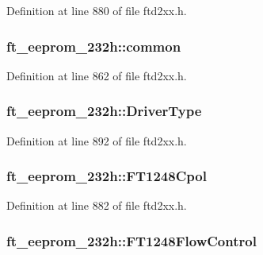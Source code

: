 Definition at line 880 of file ftd2xx.h.\hypertarget{structft__eeprom__232h_a37234d2dd02343759c92fd97e4835ccb}{
\subsubsection[{common}]{ {\bf ft\_\-eeprom\_\-232h::common}}}
\label{structft__eeprom__232h_a37234d2dd02343759c92fd97e4835ccb}


Definition at line 862 of file ftd2xx.h.\hypertarget{structft__eeprom__232h_a629a028c1c415f2f9104fe7e30154039}{
\subsubsection[{DriverType}]{ {\bf ft\_\-eeprom\_\-232h::DriverType}}}
\label{structft__eeprom__232h_a629a028c1c415f2f9104fe7e30154039}


Definition at line 892 of file ftd2xx.h.\hypertarget{structft__eeprom__232h_a372c20cdeebb5c23498d740728ac4eae}{
\subsubsection[{FT1248Cpol}]{ {\bf ft\_\-eeprom\_\-232h::FT1248Cpol}}}
\label{structft__eeprom__232h_a372c20cdeebb5c23498d740728ac4eae}


Definition at line 882 of file ftd2xx.h.\hypertarget{structft__eeprom__232h_adc5ff9bac7226be7b3181a64f24450dc}{
\subsubsection[{FT1248FlowControl}]{ {\bf ft\_\-eeprom\_\-232h::FT1248FlowControl}}}
\label{structft__eeprom__232h_adc5ff9bac7226be7b3181a64f24450dc}


